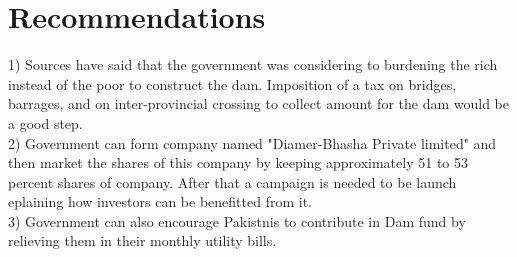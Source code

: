 \documentclass[11pt, journal,letterpaper,compsoc]{IEEEtran}
\begin{document}
\section*{Recommendations}
1) Sources  have said that the government was considering to burdening the rich instead of the poor to construct the dam. Imposition of a tax on bridges, barrages, and on inter-provincial crossing to collect amount for the dam would be a good step.  \\
2) Government can form company named "Diamer-Bhasha Private limited"  and then market the shares of this company by keeping approximately 51 to 53 percent shares of company. After that a campaign is needed to be launch eplaining how investors can be benefitted from it.\\
3) Government can also encourage Pakistnis to contribute in Dam fund by relieving them in their monthly utility bills. \cite{recomendations}
\\




\newpage
\clearpage






\end{document}
